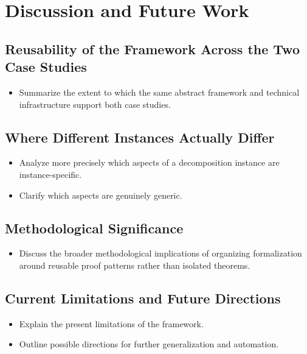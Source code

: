 \documentclass[pdflatex,sn-mathphys-num]{sn-jnl}%
\theoremstyle{thmstyleone}%
\theoremstyle{thmstyletwo}%
\theoremstyle{thmstylethree}%
\begin{document}
\section{Discussion and Future Work}
\label{sec:discussion}

\subsection{Reusability of the Framework Across the Two Case Studies}
\begin{itemize}
  \item Summarize the extent to which the same abstract framework and technical infrastructure support both case studies.
\end{itemize}

\subsection{Where Different Instances Actually Differ}
\begin{itemize}
  \item Analyze more precisely which aspects of a decomposition instance are instance-specific.
  \item Clarify which aspects are genuinely generic.
\end{itemize}

\subsection{Methodological Significance}
\begin{itemize}
  \item Discuss the broader methodological implications of organizing formalization around reusable proof patterns rather than isolated theorems.
\end{itemize}

\subsection{Current Limitations and Future Directions}
\begin{itemize}
  \item Explain the present limitations of the framework.
  \item Outline possible directions for further generalization and automation.
\end{itemize}
\end{document}
